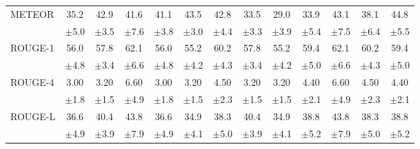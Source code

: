 \documentclass[main.tex]{subfiles}
\begin{document}
\begin{table}[t]
{\begin{tabular}{l@{\hspace{3mm}}*{3}{c}@{\hspace{3mm}}*{3}{c}@{\hspace{3mm}}*{3}{c}@{\hspace{3mm}}*{3}{c}}
    \hline
    \multirow{2}{*}{METEOR} & {\normalsize 35.2} & {\normalsize 42.9} & {\normalsize 41.6} & {\normalsize 41.1} & {\normalsize 43.5} & {\normalsize 42.8} & {\normalsize 33.5} & {\normalsize 29.0} & {\normalsize 33.9} & {\normalsize 43.1} & {\normalsize 38.1} & {\normalsize 44.8} \\
                    & {\footnotesize $\pm$5.0} & {\footnotesize $\pm$3.5} & {\footnotesize $\pm$7.6} & {\footnotesize $\pm$3.8} & {\footnotesize $\pm$3.0} & {\footnotesize $\pm$4.4} & {\footnotesize $\pm$3.3} & {\footnotesize $\pm$3.9} & {\footnotesize $\pm$5.4} & {\footnotesize $\pm$7.5} & {\footnotesize $\pm$6.4} & {\footnotesize $\pm$5.5} \\
    \hline
    \multirow{2}{*}{ROUGE-1} & {\normalsize 56.0} & {\normalsize 57.8} & {\normalsize 62.1} & {\normalsize 56.0} & {\normalsize 55.2} & {\normalsize 60.2} & {\normalsize 57.8} & {\normalsize 55.2} & {\normalsize 59.4} & {\normalsize 62.1} & {\normalsize 60.2} & {\normalsize 59.4} \\
                     & {\footnotesize $\pm$4.8} & {\footnotesize $\pm$3.4} & {\footnotesize $\pm$6.6} & {\footnotesize $\pm$4.8} & {\footnotesize $\pm$4.2} & {\footnotesize $\pm$4.3} & {\footnotesize $\pm$3.4} & {\footnotesize $\pm$4.2} & {\footnotesize $\pm$5.0} & {\footnotesize $\pm$6.6} & {\footnotesize $\pm$4.3} & {\footnotesize $\pm$5.0} \\
    \hline
    \multirow{2}{*}{ROUGE-4} & {\normalsize 3.00} & {\normalsize 3.20} & {\normalsize 6.60} & {\normalsize 3.00} & {\normalsize 3.20} & {\normalsize 4.50} & {\normalsize 3.20} & {\normalsize 3.20} & {\normalsize 4.40} & {\normalsize 6.60} & {\normalsize 4.50} & {\normalsize 4.40} \\
                     & {\footnotesize $\pm$1.8} & {\footnotesize $\pm$1.5} & {\footnotesize $\pm$4.9} & {\footnotesize $\pm$1.8} & {\footnotesize $\pm$1.5} & {\footnotesize $\pm$2.3} & {\footnotesize $\pm$1.5} & {\footnotesize $\pm$1.5} & {\footnotesize $\pm$2.1} & {\footnotesize $\pm$4.9} & {\footnotesize $\pm$2.3} & {\footnotesize $\pm$2.1} \\
    \hline
    \multirow{2}{*}{ROUGE-L} & {\normalsize 36.6} & {\normalsize 40.4} & {\normalsize 43.8} & {\normalsize 36.6} & {\normalsize 34.9} & {\normalsize 38.3} & {\normalsize 40.4} & {\normalsize 34.9} & {\normalsize 38.8} & {\normalsize 43.8} & {\normalsize 38.3} & {\normalsize 38.8} \\
                     & {\footnotesize $\pm$4.9} & {\footnotesize $\pm$3.9} & {\footnotesize $\pm$7.9} & {\footnotesize $\pm$4.9} & {\footnotesize $\pm$4.1} & {\footnotesize $\pm$5.0} & {\footnotesize $\pm$3.9} & {\footnotesize $\pm$4.1} & {\footnotesize $\pm$5.2} & {\footnotesize $\pm$7.9} & {\footnotesize $\pm$5.0} & {\footnotesize $\pm$5.2} \\

\end{tabular}}
\end{table}
\end{document}
